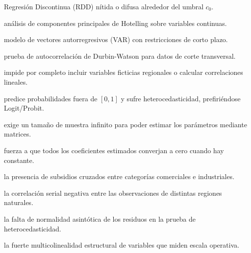 \begin{opts}
    \item Regresión Discontinua (RDD) nítida o difusa alrededor del umbral $c_0$.
    \item análisis de componentes principales de Hotelling sobre variables continuas.
    \item modelo de vectores autorregresivos (VAR) con restricciones de corto plazo.
    \item prueba de autocorrelación de Durbin-Watson para datos de corte transversal.
\end{opts}

\begin{opts}
    \item impide por completo incluir variables ficticias regionales o calcular correlaciones lineales.
    \item predice probabilidades fuera de $[0, 1]$ y sufre heterocedasticidad, prefiriéndose Logit/Probit.
    \item exige un tamaño de muestra infinito para poder estimar los parámetros mediante matrices.
    \item fuerza a que todos los coeficientes estimados converjan a cero cuando hay constante.
\end{opts}

\begin{opts}
    \item la presencia de subsidios cruzados entre categorías comerciales e industriales.
    \item la correlación serial negativa entre las observaciones de distintas regiones naturales.
    \item la falta de normalidad asintótica de los residuos en la prueba de heterocedasticidad.
    \item la fuerte multicolinealidad estructural de variables que miden escala operativa.
\end{opts}

